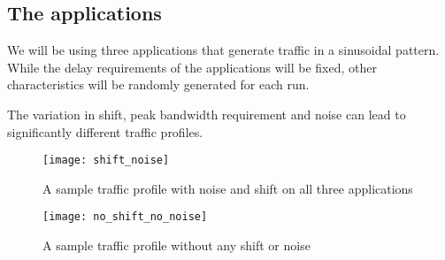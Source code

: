 \subsection{The applications} \label{applications}
We will be using three applications that generate traffic in a sinusoidal pattern. \\ While the delay requirements of the applications
will be fixed, other characteristics will be randomly generated for each run.
\begin{table}[h]
	\centering
\end{table}

\pagebreak

The variation in shift, peak bandwidth requirement and noise can lead to significantly different traffic profiles. 


\begin{figure}[h!]
	\texttt{[image: shift\_noise]}
	\caption{A sample traffic profile with noise and shift on all three applications}	
	\centering
\end{figure}

\begin{figure}[h!]
	\texttt{[image: no\_shift\_no\_noise]}
	\caption{A sample traffic profile without any shift or noise}	
	\centering
\end{figure}


